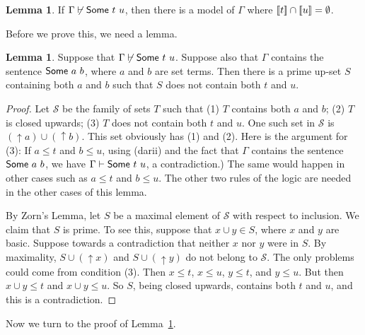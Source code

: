 \documentclass[12pt]{article}
\theoremstyle{definition}
\newtheorem{lemma}[theorem]{Lemma}
\newcommand{\semantics}[1]{[\![\mbox{\em $ #1 $\/}]\!]}
\renewcommand{\SS}{\mathcal{S}}
\newcommand{\proves}{\vdash}
\begin{document}
 \begin{lemma} \label{lemma-2-all-some-unions}
 If $\Gamma\not\proves \mbox{\sf Some $t$ $u$}$, then there is a model of $\Gamma$
 where $\semantics{t}\cap\semantics{u} = \emptyset$.
\end{lemma}

 
Before we prove this, we need a lemma.
 
 \begin{lemma}
 Suppose that $\Gamma\not\proves \mbox{\sf Some $t$ $u$}$.
 Suppose also that $\Gamma$ contains the sentence $\mbox{\sf Some $a$ $b$}$, where $a$ and $b$
 are set terms.
 Then there is a prime up-set $S$ containing both $a$ and $b$ such that
 $S$
 does not contain both $t$ and $u$.
 \end{lemma}
 

\begin{proof}
Let $\SS$ be the family of sets $T$ such that (1) $T$ contains both $a$ and $b$;
(2) $T$ is closed upwards;
(3) $T$  does not contain both $t$ and $u$.
One such set in $\SS$ is $(\uparrow a)\cup (\uparrow b)$.  
  This set obviously has (1) and (2).
Here is the argument for (3):
 If $a\leq t$
and $b\leq u$, using ({\sc darii})
and 
 the fact that $\Gamma$ contains the sentence $\mbox{\sf Some $a$ $b$}$,
 we have
 $\Gamma\proves  \mbox{\sf Some $t$ $u$}$, a contradiction.)
The same would happen in other cases such as $a\leq t$ and $b\leq u$.
The other two rules of the logic are needed in the other cases of this lemma.

By Zorn's Lemma, let $S$ be a maximal element of $\SS$ with respect to inclusion.
We claim that 
$S$ is  prime.   To see this, suppose that $x \cup y\in S$,
where $x$ and $y$ are basic.
Suppose towards a contradiction that neither $x$ nor $y$ were in $S$.
By maximality, $S\cup(\uparrow x)$ and $S\cup(\uparrow y)$  do not belong to $\SS$. 
The only problems could come from condition (3).
Then $x\leq t$, $x\leq u$, $y\leq t$, and $y\leq u$.
But then $x\cup y \leq t$ and $x\cup y\leq u$.
So $S$, being closed upwards, contains both $t$ and $u$, and this is a contradiction.
 \end{proof}
 
 Now we turn to the proof of 
 Lemma~\ref{lemma-2-all-some-unions}.
 
\end{document}
